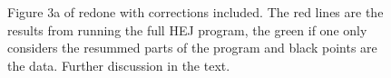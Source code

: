 \begin{figure}[t]
\caption{Figure 3a of \cite{Aad2014} redone with corrections included. The red lines are the results from running the full HEJ program, the green if one only considers the resummed parts of the program and black points are the data. Further discussion in the text.}
\label{fig:newveto3a}
\end{figure}


